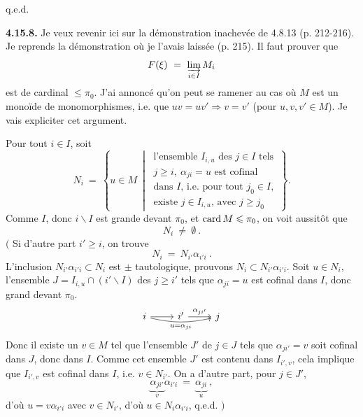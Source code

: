 \hfill q.e.d.


\textbf{4.15.8.} Je veux revenir ici sur la démonstration inachevée de 4.8.13 (p. 212-216). Je reprends la démonstration où je l'avais laissée (p. 215). Il faut prouver que
\[
F(\xi) \ = \ \varinjlim_{i\in I} M_i
\]
est de cardinal $\leqslant \pi_0$. J'ai annoncé qu'on peut se ramener au cas où $M$ est un monoïde de monomorphismes, i.e. que $uv = uv' \Longrightarrow v = v'$ (pour $u,v,v' \in M$). Je vais expliciter cet argument.

Pour tout $i\in I$, soit
\[
N_i \ = \ \left\{ u \in M \ \middle| \ \begin{array}{l}
\text{l'ensemble } I_{i,u} \text{ des } j\in I \text{ tels}\\
j \geqslant i,\ \alpha_{ji} = u \text{ est cofinal}\\
\text{dans } I\text{, i.e. pour tout } j_0\in I,\\
\text{existe } j \in I_{i,u}\text{, avec } j \geqslant j_0
\end{array} \right\} .
\tag*{(4.15.8.1)}
\]
Comme $I$, donc $i\backslash I$ est grande devant $\pi_0$, et $\operatorname{card} M \leqslant \pi_0$, on voit aussitôt que
\[
N_i \ \neq \ \emptyset \ .
\tag*{(4.15.8.2)}
\]
$\Big($ Si d'autre part $i' \geqslant i$, on trouve
\[
N_i \ = \ N_{i'}\alpha_{i'i} \ .
\tag*{(4.15.8.3)}
\]
L'inclusion $N_{i'}\alpha_{i'i} \subset N_i$ est $\pm$ tautologique, prouvons $N_i \subset N_{i'}\alpha_{i'i}$. Soit $u \in N_i$, l'ensemble $J = I_{i,u} \cap (i'\backslash I)$ des $j \geqslant i'$ tels que $\alpha_{ji} = u$ est cofinal dans $I$, donc grand devant $\pi_0$.
\[
\begin{tikzcd}
i \arrow[r] \arrow[rr, bend right=12, "u = \alpha_{ji}"'] & i' \arrow[r, "\alpha_{ji'}"] & j
\end{tikzcd}
\]
Donc il existe un $v \in M$ tel que l'ensemble $J'$ de $j\in J$ tels que $\alpha_{ji'} = v$
soit cofinal dans $J$, donc dans $I$. Comme cet ensemble $J'$ est contenu dans $I_{i',v}$, cela implique que $I_{i',v}$ est cofinal dans $I$, i.e. $v \in N_{i'}$. On a d'autre part, pour $j \in J'$,
\[
\underbrace{\alpha_{ji'}}_{v}\alpha_{i'i} \ = \ \underbrace{\alpha_{ji}}_{u} \ ,
\]
d'où $u = v\alpha_{i'i}$ avec $v\in N_{i'}$, d'où $u \in N_i\alpha_{i'i}$, q.e.d. $\Big)$ %

